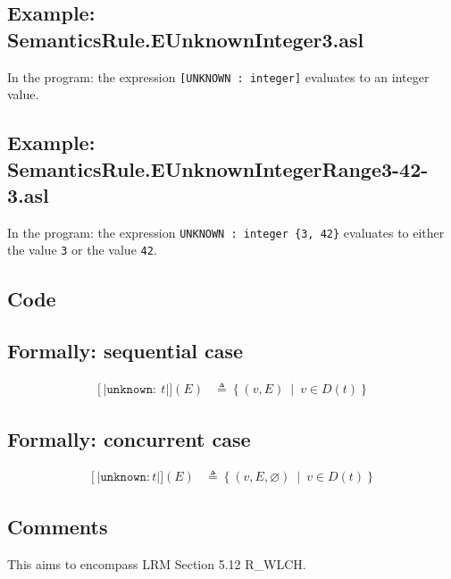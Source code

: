 \documentclass{book}
\newcommand\syntt[1]{\mathtt{#1}}
\newcommand\llbracket{[|}
\newcommand\rrbracket{|]}
\newcommand\interp[1]{\left\llbracket #1 \right\rrbracket}
\newcommand\st[0]{\ \middle|\ }
\begin{document}
  \subsection{Example: SemanticsRule.EUnknownInteger3.asl}
    In the program:
    the expression \texttt{[UNKNOWN : integer]} evaluates to an integer value.

  \subsection{Example: SemanticsRule.EUnknownIntegerRange3-42-3.asl}

    In the program:
    the expression \texttt{UNKNOWN : integer \{3, 42\}} evaluates to either the value
\texttt{3} or the value \texttt{42}.

  \subsection{Code}

  \subsection{Formally: sequential case}

  \begin{align}  
  \interp{\syntt{unknown:}\ t} (E) & \triangleq \left\{ (v, E) \st{} v \in{} D(t) \right\}
  \label{eq:sem-seq-unknown}  
  \end{align}  

  \subsection{Formally: concurrent case}

  \begin{align}
  \interp{\syntt{unknown:} t} (E) & \triangleq \left\{ (v, E, \varnothing) \st{} v \in{} D(t) \right\}
  \label{eq:sem-conc-unknown}
  \end{align}

  \subsection{Comments}
  This aims to encompass LRM Section 5.12 R\_WLCH.
\end{document}
